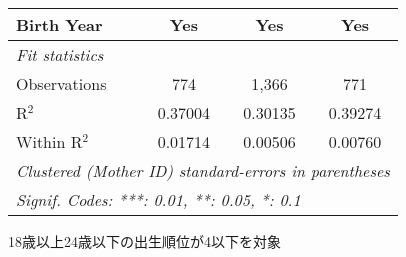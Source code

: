 \documentclass{article}
\begin{document}
\begin{landscape}
\begin{threeparttable}[b]
\begin{tabular}{lccc}
      Birth Year                                          & Yes                 & Yes          & Yes\\  
      \midrule
      \emph{Fit statistics}\\
      Observations                                        & 774                 & 1,366        & 771\\  
      R$^2$                                               & 0.37004             & 0.30135      & 0.39274\\  
      Within R$^2$                                        & 0.01714             & 0.00506      & 0.00760\\  
      \midrule \midrule
      \multicolumn{4}{l}{\emph{Clustered (Mother ID) standard-errors in parentheses}}\\
      \multicolumn{4}{l}{\emph{Signif. Codes: ***: 0.01, **: 0.05, *: 0.1}}\\
   \end{tabular}
   
   \begin{tablenotes}\item 18歳以上24歳以下の出生順位が4以下を対象
   \end{tablenotes}
\end{threeparttable}
\par\endgroup


\end{landscape}
\end{document}
